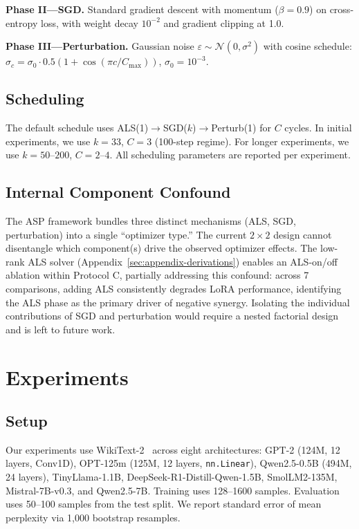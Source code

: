 \documentclass[11pt]{article}
\begin{document}
\textbf{Phase II---SGD.} Standard gradient descent with momentum ($\beta=0.9$) on cross-entropy loss, with weight decay $10^{-2}$ and gradient clipping at 1.0.

\textbf{Phase III---Perturbation.} Gaussian noise $\varepsilon \sim \mathcal{N}(0, \sigma^2)$ with cosine schedule: $\sigma_c = \sigma_0 \cdot 0.5(1 + \cos(\pi c / C_{\max}))$, $\sigma_0 = 10^{-3}$.

\subsection{Scheduling}

The default schedule uses ALS(1)$\rightarrow$SGD($k$)$\rightarrow$Perturb(1) for $C$ cycles. In initial experiments, we use $k=33$, $C=3$ (100-step regime). For longer experiments, we use $k=50$--$200$, $C=2$--$4$. All scheduling parameters are reported per experiment.

\subsection{Internal Component Confound}

The ASP framework bundles three distinct mechanisms (ALS, SGD, perturbation) into a single ``optimizer type.'' The current $2\times2$ design cannot disentangle which component(s) drive the observed optimizer effects. The low-rank ALS solver (Appendix~\ref{sec:appendix-derivations}) enables an ALS-on/off ablation within Protocol C, partially addressing this confound: across 7 comparisons, adding ALS consistently degrades LoRA performance, identifying the ALS phase as the primary driver of negative synergy. Isolating the individual contributions of SGD and perturbation would require a nested factorial design and is left to future work.

\section{Experiments}

\subsection{Setup}

Our experiments use WikiText-2~\cite{merity2017pointer} across eight architectures: GPT-2 (124M, 12 layers, Conv1D), OPT-125m (125M, 12 layers, \texttt{nn.Linear}), Qwen2.5-0.5B (494M, 24 layers), TinyLlama-1.1B, DeepSeek-R1-Distill-Qwen-1.5B, SmolLM2-135M, Mistral-7B-v0.3, and Qwen2.5-7B. Training uses 128--1600 samples. Evaluation uses 50--100 samples from the test split. We report standard error of mean perplexity via 1,000 bootstrap resamples.
\end{document}

